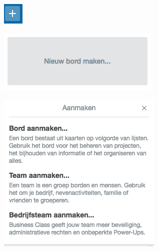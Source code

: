\begin{figure}[H]
	\centering
	\begin{subfigure}{.5\textwidth}
		\centering
		\includegraphics[scale=1]{./afbeeldingen/plus.png}
		\label{fig:aanmaken_start}
	\end{subfigure}%
	\begin{subfigure}{.5\textwidth}
		\centering
		\includegraphics[width=.9\textwidth]{./afbeeldingen/nieuw_bord_maken.png}
		\label{fig:nieuw_bord_maken}
	\end{subfigure}\hfill
	\begin{subfigure}{.5\textwidth}
		\centering
		\includegraphics[width=\textwidth]{./afbeeldingen/aanmaken.png}

\end{subfigure}
\end{figure}
